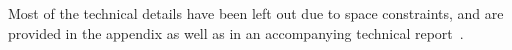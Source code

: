 Most of the technical details have been left out due to space
constraints, and are provided in the appendix as well as in an
accompanying technical report~\cite{colosl-tr14}.

%
%
%
%
%
%
%
%
%
%


